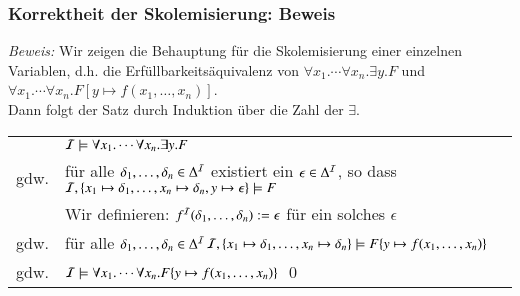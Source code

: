 \documentclass[aspectratio=1610,onlymath]{beamer}
\begin{document}
\begin{frame}\frametitle{Korrektheit der Skolemisierung: Beweis}

\medskip

\emph{Beweis:} Wir zeigen die Behauptung für die Skolemisierung einer einzelnen Variablen, d.h. die Erfüllbarkeitsäquivalenz von $\forall x_1.\cdots\forall x_n.\exists y.F$ und $\forall x_1.\cdots\forall x_n.F[y\mapsto f(x_1,\ldots,x_n)]$.\\\pause
Dann folgt der Satz durch Induktion über die Zahl der $\exists$.\bigskip\pause

\begin{tabular}{lp{8cm}}
	& $\mathcal{I}\models \forall x_1.\cdots\forall x_n.\exists y.F$\\\pause
gdw. & für alle $\delta_1,\ldots, \delta_n\in\Delta^{\mathcal{I}}$ existiert ein $\epsilon\in\Delta^{\mathcal{I}}$, so dass $\mathcal{I},\{x_1\mapsto\delta_1,\ldots,x_n\mapsto \delta_n,y\mapsto\epsilon\}\models F$\\[-2ex]\pause
	& \alert{Wir definieren:} $f^{\mathcal{I}}(\delta_1,\ldots, \delta_n)\mathrel{:=}\epsilon$ für ein solches $\epsilon$\\\pause
gdw. & für alle $\delta_1,\ldots, \delta_n\in\Delta^{\mathcal{I}}$\newline $\mathcal{I},\{x_1\mapsto\delta_1,\ldots,x_n\mapsto \delta_n\}\models F\{y\mapsto f(x_1,\ldots,x_n)\}$\\\pause
gdw. & $\mathcal{I}\models \forall x_1.\cdots\forall x_n.F\{y\mapsto f(x_1,\ldots,x_n)\}$ \hspace{5cm}\qed
\end{tabular}
% 


\end{frame}
\end{document}

